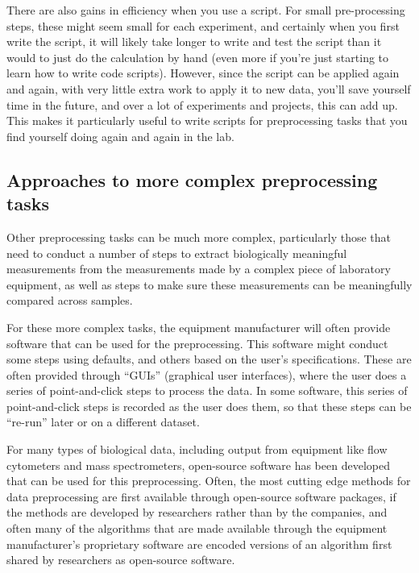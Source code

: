 \documentclass[]{tufte-book}
\begin{document}
There are also gains in efficiency when you use a script. For small
pre-processing steps, these might seem small for each experiment, and certainly
when you first write the script, it will likely take longer to write and test
the script than it would to just do the calculation by hand (even more if
you're just starting to learn how to write code scripts). However, since the
script can be applied again and again, with very little extra work to apply it
to new data, you'll save yourself time in the future, and over a lot of
experiments and projects, this can add up. This makes it particularly useful to
write scripts for preprocessing tasks that you find yourself doing again and
again in the lab.

\hypertarget{approaches-to-more-complex-preprocessing-tasks}{%
\subsection{Approaches to more complex preprocessing tasks}\label{approaches-to-more-complex-preprocessing-tasks}}

Other preprocessing tasks can be much more complex, particularly those that need
to conduct a number of steps to extract biologically meaningful measurements
from the measurements made by a complex piece of laboratory equipment, as well
as steps to make sure these measurements can be meaningfully compared across
samples.

For these more complex tasks, the equipment manufacturer will often provide
software that can be used for the preprocessing. This software might conduct
some steps using defaults, and others based on the user's specifications. These
are often provided through ``GUIs'' (graphical user interfaces), where the user
does a series of point-and-click steps to process the data. In some software,
this series of point-and-click steps is recorded as the user does them, so that
these steps can be ``re-run'' later or on a different dataset.

For many types of biological data, including output from equipment like flow
cytometers and mass spectrometers, open-source software has been developed
that can be used for this preprocessing. Often, the most cutting edge methods
for data preprocessing are first available through open-source software packages,
if the methods are developed by researchers rather than by the companies, and
often many of the algorithms that are made available through the equipment
manufacturer's proprietary software are encoded versions of an algorithm
first shared by researchers as open-source software.
\end{document}
